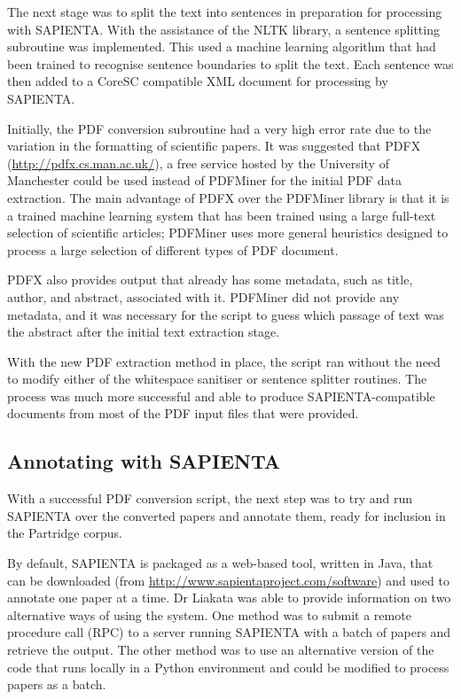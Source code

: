 The next stage was to split the text into sentences in preparation for
processing with SAPIENTA. With the assistance of the NLTK library, a sentence
splitting subroutine was implemented. This used a machine learning algorithm
that had been trained to recognise sentence boundaries to split the text. Each
sentence was then added to a CoreSC compatible XML document for processing by
SAPIENTA.

Initially, the PDF conversion subroutine had a very high error rate due to the
variation in the formatting of scientific papers. It was suggested that PDFX
(\url{http://pdfx.cs.man.ac.uk/}), a free service hosted by the University of
Manchester could be used instead of PDFMiner for the initial PDF data
extraction. The main advantage of PDFX over the PDFMiner library is that it is a
trained machine learning system that has been trained using a large full-text
selection of scientific articles; PDFMiner uses more general heuristics
designed to process a large selection of different types of PDF document.

PDFX also provides output that already has some metadata, such as title,
author, and abstract, associated with it. PDFMiner did not provide any
metadata, and it was necessary for the script to guess which passage of text
was the abstract after the initial text extraction stage.

With the new PDF extraction method in place, the script ran without the need
to modify either of the whitespace sanitiser or sentence splitter routines. The
process was much more successful and able to produce SAPIENTA-compatible
documents from most of the PDF input files that were provided.

\subsection{Annotating with SAPIENTA}

With a successful PDF conversion script, the next step was to try and run
SAPIENTA over the converted papers and annotate them, ready for inclusion in
the Partridge corpus.

By default, SAPIENTA is packaged as a web-based tool, written in Java, that
can be downloaded (from \url{http://www.sapientaproject.com/software}) and used
to annotate one paper at a time. Dr Liakata was able to provide information on
two alternative ways of using the system. One method was to submit a remote
procedure call (RPC) to a server running SAPIENTA with a batch of papers and
retrieve the output. The other method was to use an alternative version of the
code that runs locally in a Python environment and could be modified to process
papers as a batch.

